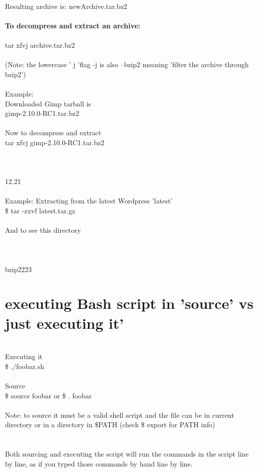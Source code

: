 \documentclass[10pt,a4paper]{article}
\begin{document}
{{{{{{{{{{{{{\\
Resulting archive is:      newArchive.tar.bz2\\
\\
\textbf{To decompress and extract an archive:}\\
\\
tar xfvj archive.tar.bz2\\
\\
(Note: the lowercase ' j 'flag -j is also --bzip2 meaning 'filter the archive through bzip2') \\
\\
Example: \\
Downloaded Gimp tarball is\\
gimp-2.10.0-RC1.tar.bz2\\
\\
Now to decompress and extract\\
tar xfvj gimp-2.10.0-RC1.tar.bz2\\
\\
\\
\\
12.21\\
\\
Example: Extracting from the latest Wordpress 'latest'\\
\$ tar -zxvf latest.tar.gz\\
\\
And to see this directory\\
\\
\\
\\
bzip2223
\hypertarget{executing_bash_script_in_'source'_vs_just_executing_it'}{\section {executing Bash script in 'source' vs just executing it'}}
{\large \\
Executing it  \\
	\$ ./foobar.sh\\
\\
Source\\
	\$ source foobar  or  \$ . foobar\\
\\
Note: to source it must be a valid shell script and the file can be in current directory or in a directory in \$PATH (check \$ export for PATH info)\\
\\
\\
Both sourcing and executing the script will run the commands in the script line by line, as if you typed those commands by hand line by line.\\
}}}}}}}}}}}}}}
\end{document}
